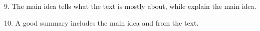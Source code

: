 \documentclass[12pt]{article}
\begin{document}
9. The main idea tells what the text is mostly about, while \underline{\hspace{4cm}} explain the main idea.

\vspace{3cm}

10. A good summary includes the main idea and \underline{\hspace{4cm}} from the text.

\vspace{3cm}












\end{document}
